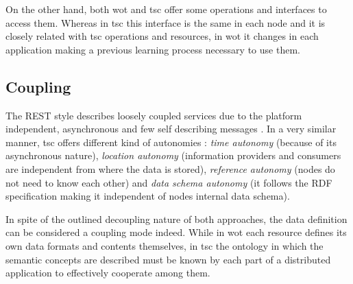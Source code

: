 On the other hand, both \ac{wot} and \ac{tsc} offer some operations and interfaces to access them. Whereas in \ac{tsc} this interface is the same in each node
and it is closely related with \ac{tsc} operations and resources, in \ac{wot} it changes in each application making a previous learning process necessary
to use them.


\subsection{Coupling}
\label{sec:coupling}
The REST style describes loosely coupled services due to the platform independent, asynchronous and few self describing messages
\citep{pautasso_why_2009}. In a very similar manner, \ac{tsc} offers different kind of autonomies \citep{krummenacher_www_2005}:
\textit{time autonomy} (because of its asynchronous nature), \textit{location autonomy} (information providers and consumers are independent
from where the data is stored), \textit{reference autonomy} (nodes do not need to know each other) and
\textit{data schema autonomy} (it follows the RDF specification making it independent of nodes internal data schema).

In spite of the outlined decoupling nature of both approaches, the data definition can be considered a coupling mode indeed.
While in \ac{wot} each resource defines its own data formats and contents themselves, in \ac{tsc} the ontology in which the semantic
concepts are described must be known by each part of a distributed application to effectively cooperate among them.

